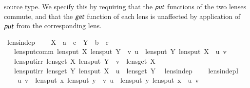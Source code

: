 \begin{isabellebody}
\begin{isamarkuptext}
  source type. We specify this by requiring that the $\textit{\textsf{put}}$ functions of the two lenses commute,
  and that the $\textit{\textsf{get}}$ function of each lens is unaffected by application of $\textit{\textsf{put}}$ from the
  corresponding lens.%
\end{isamarkuptext}\isamarkuptrue%
\isamarkupfalse%
\ lens{\isacharunderscore}indep\ {\isacharequal}\isanewline
\ \ \ X\ {\isacharcolon}{\isacharcolon}\ {\isachardoublequoteopen}{\isacharprime}a\ {\isasymLongrightarrow}\ {\isacharprime}c{\isachardoublequoteclose}\ \ Y\ {\isacharcolon}{\isacharcolon}\ {\isachardoublequoteopen}{\isacharprime}b\ {\isasymLongrightarrow}\ {\isacharprime}c{\isachardoublequoteclose}\isanewline
\ \ \ lens{\isacharunderscore}put{\isacharunderscore}comm{\isacharcolon}\ {\isachardoublequoteopen}lens{\isacharunderscore}put\ X\ {\isacharparenleft}lens{\isacharunderscore}put\ Y\ {\isasymsigma}\ v{\isacharparenright}\ u\ {\isacharequal}\ lens{\isacharunderscore}put\ Y\ {\isacharparenleft}lens{\isacharunderscore}put\ X\ {\isasymsigma}\ u{\isacharparenright}\ v{\isachardoublequoteclose}\isanewline
\ \ \ lens{\isacharunderscore}put{\isacharunderscore}irr{}{\isacharcolon}\ {\isachardoublequoteopen}lens{\isacharunderscore}get\ X\ {\isacharparenleft}lens{\isacharunderscore}put\ Y\ {\isasymsigma}\ v{\isacharparenright}\ {\isacharequal}\ lens{\isacharunderscore}get\ X\ {\isasymsigma}{\isachardoublequoteclose}\isanewline
\ \ \ lens{\isacharunderscore}put{\isacharunderscore}irr{}{\isacharcolon}\ {\isachardoublequoteopen}lens{\isacharunderscore}get\ Y\ {\isacharparenleft}lens{\isacharunderscore}put\ X\ {\isasymsigma}\ u{\isacharparenright}\ {\isacharequal}\ lens{\isacharunderscore}get\ Y\ {\isasymsigma}{\isachardoublequoteclose}\isanewline
\isanewline
{}\isamarkupfalse%
\ lens{\isacharunderscore}indep\ {\isacharparenleft}\ {\isachardoublequoteopen}{\isasymbowtie}{\isachardoublequoteclose}\ {}{}{\isacharparenright}\isanewline
\isanewline
{}\isamarkupfalse%
\ lens{\isacharunderscore}indepI{\isacharcolon}\isanewline
\ \ {\isachardoublequoteopen}{\isasymlbrakk}\ {\isasymAnd}\ u\ v\ {\isasymsigma}{\isachardot}\ lens{\isacharunderscore}put\ x\ {\isacharparenleft}lens{\isacharunderscore}put\ y\ {\isasymsigma}\ v{\isacharparenright}\ u\ {\isacharequal}\ lens{\isacharunderscore}put\ y\ {\isacharparenleft}lens{\isacharunderscore}put\ x\ {\isasymsigma}\ u{\isacharparenright}\ v{\isacharsemicolon}\isanewline

\end{isabellebody}
